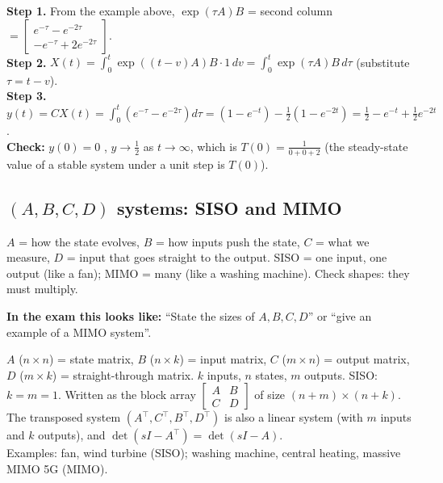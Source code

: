 \begin{workbox}[title={Worked example: step response of $A=\begin{bmatrix}0&1\\-2&-3\end{bmatrix}$, $B=\begin{bmatrix}0\\1\end{bmatrix}$, $C=[1\ 0]$, $u=1$, $X_0=0$}]
\textbf{Step 1.} From the example above, $\exp(\tau A)B$ = second column $=\begin{bmatrix}e^{-\tau}-e^{-2\tau}\\-e^{-\tau}+2e^{-2\tau}\end{bmatrix}$.\\
\textbf{Step 2.} $X(t)=\int_0^t\exp((t-v)A)B\cdot1\,dv=\int_0^t\exp(\tau A)B\,d\tau$ (substitute $\tau=t-v$).\\
\textbf{Step 3.} $y(t)=CX(t)=\int_0^t(e^{-\tau}-e^{-2\tau})d\tau=(1-e^{-t})-\tfrac12(1-e^{-2t})=\boxed{\tfrac12-e^{-t}+\tfrac12e^{-2t}}$.\\
\textbf{Check:} $y(0)=0$ \checkmark, $y\to\frac12$ as $t\to\infty$, which is $T(0)=\frac1{0+0+2}$ \checkmark (the steady-state value of a stable system under a unit step is $T(0)$).
\end{workbox}

\subsection{\texorpdfstring{$(A,B,C,D)$}{(A,B,C,D)} systems: SISO and MIMO \texorpdfstring{}{}}\label{ss:2-8}
\begin{plainbox}
$A$ = how the state evolves, $B$ = how inputs push the state, $C$ = what we measure, $D$ = input that goes straight to the output.
SISO = one input, one output (like a fan); MIMO = many (like a washing machine). Check shapes: they must multiply.
\par\smallskip\textbf{In the exam this looks like:} ``State the sizes of $A,B,C,D$'' or ``give an example of a MIMO system''.
\end{plainbox}
\begin{defbox}
$A$ ($n\times n$) = state matrix, $B$ ($n\times k$) = input matrix, $C$ ($m\times n$) = output matrix, $D$ ($m\times k$) = straight-through matrix.
$k$ inputs, $n$ states, $m$ outputs. SISO: $k=m=1$. Written as the block array $\begin{bmatrix}A&B\\C&D\end{bmatrix}$ of size $(n+m)\times(n+k)$.
The transposed system $(A^\top,C^\top,B^\top,D^\top)$ is also a linear system (with $m$ inputs and $k$ outputs), and $\det(sI-A^\top)=\det(sI-A)$.\\
Examples: fan, wind turbine (SISO); washing machine, central heating, massive MIMO 5G (MIMO).
\end{defbox}

